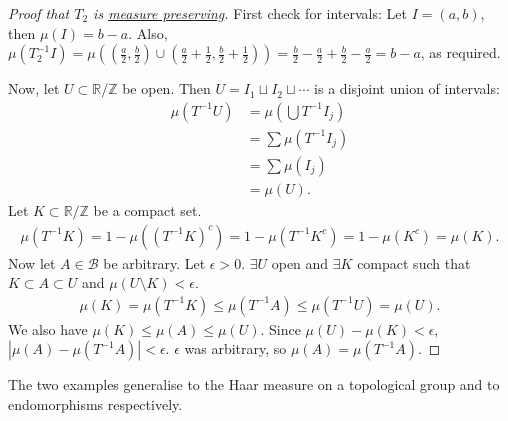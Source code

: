 \documentclass{article}
\begin{document}
\begin{proof}[Proof that \hyperlink{def:doubling}{$T_2$} is \hyperlink{def:mps}{measure preserving}]
  First check for intervals: Let $I = (a,b)$, then $\mu(I) = b-a$.
  Also, $\mu(T_2^{-1}I) = \mu\left((\frac{a}{2},\frac{b}{2}) \cup (\frac{a}{2} + \frac{1}{2}, \frac{b}{2} + \frac{1}{2})\right) = \frac{b}{2} - \frac{a}{2} + \frac{b}{2} - \frac{a}{2} = b - a$, as required.

  Now, let $U \subset \mathbb{R}/\mathbb{Z}$ be open. Then $U = I_1 \sqcup I_2 \sqcup \dotsb$ is a disjoint union of intervals:
  \begin{align*}
    \mu(T^{-1} U) &= \mu\left(\bigcup T^{-1} I_j\right) \\
                  &= \sum \mu(T^{-1} I_j) \\
                  &= \sum \mu(I_j) \\
                  &= \mu(U).
  \end{align*}
  Let $K \subset \mathbb{R}/\mathbb{Z}$ be a compact set.
  \begin{align*}
    \mu(T^{-1} K) = 1 - \mu((T^{-1} K)^c) = 1 - \mu(T^{-1} K^c) = 1 - \mu(K^c) = \mu(K).
  \end{align*}
  Now let $A \in \mathcal{B}$ be arbitrary. Let $\epsilon > 0$. $\exists U$ open and $\exists K$ compact such that $K \subset A \subset U$ and $\mu(U \setminus K) < \epsilon$.
  \begin{align*}
    \mu(K) = \mu(T^{-1} K) \leq \mu(T^{-1} A) \leq \mu(T^{-1} U) = \mu(U).
  \end{align*}
  We also have $\mu(K) \leq \mu(A) \leq \mu(U)$.
  Since $\mu(U) - \mu(K) < \epsilon$, $|\mu(A) - \mu(T^{-1}A)| < \epsilon$. $\epsilon$ was arbitrary, so $\mu(A) = \mu(T^{-1} A)$.
\end{proof}

The two examples generalise to the Haar measure on a topological group and to endomorphisms respectively.
\end{document}
